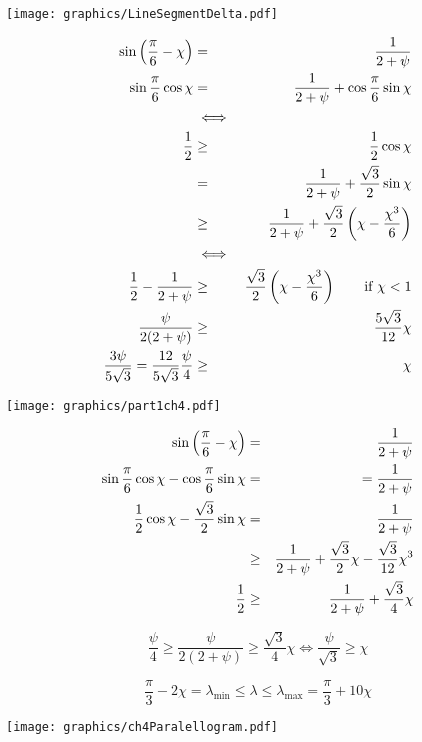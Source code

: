 


\begin{minipage}{\linewidth}
\begin{center}
\texttt{[image: graphics/LineSegmentDelta.pdf]}
\label{fig:LineSegmentDelta.pdf}
\end{center}
\end{minipage}
\begin{eqnarray*}
\sin \left( \frac{\pi}{6} - \chi \right) &=& \frac{1}{2+\psi}\\
\sin \frac{\pi}{6} \cos \chi &=& \frac{1}{2+\psi} + \cos \frac{\pi}{6} \sin \chi\\
&\iff&\\
\frac{1}{2} &\geq& \frac{1}{2} \cos \chi \\
&=& \frac{1}{2+\psi} + \frac{\sqrt{3}}{2} \sin \chi\\
&\geq& \frac{1}{2+\psi} + \frac{\sqrt{3}}{2} \left(  \chi - \frac{\chi^3}{6} \right)\\
&\iff&\\
\frac{1}{2}-\frac{1}{2+\psi} &\geq& \frac{\sqrt{3}}{2} \left(  \chi - \frac{\chi^3}{6} \right) \qquad \text{if }\chi < 1\\
\frac{\psi}{2 ( 2 + \psi)} &\geq&  \frac{5\sqrt{3}}{12} \chi\\
\frac{3 \psi}{5\sqrt{3}}=\frac{12}{5\sqrt{3}} \frac{\psi}{4} &\geq& \chi
\end{eqnarray*}

\begin{minipage}{\linewidth}
\begin{center}
\texttt{[image: graphics/part1ch4.pdf]}
\label{fig:part1ch4.pdf}
\end{center}
\end{minipage}
\begin{eqnarray*}
\sin \left( \frac{\pi}{6}- \chi \right) &=& \frac{1}{2+ \psi}\\
\sin \frac{\pi}{6} \cos \chi - \cos \frac{\pi}{6} \sin \chi &=& = \frac{1}{2+\psi}\\
\frac{1}{2} \cos \chi - \frac{\sqrt{3}}{2} \sin \chi &=& \frac{1}{2+\psi}\\
&\geq& \frac{1}{2+\psi} + \frac{\sqrt{3}}{2} \chi - \frac{\sqrt{3}}{12} \chi^3 \\
\frac{1}{2} &\geq&  \frac{1}{2+\psi} + \frac{\sqrt{3}}{4} \chi\\
\end{eqnarray*}

$$\frac{\psi}{4} \geq \frac{\psi}{2 (2 + \psi)}\geq \frac{\sqrt{3}}{4} \chi\iff \frac{\psi}{\sqrt{3}} \geq \chi$$

$$\frac{\pi}{3} - 2 \chi = \lambda_\text{min} \leq \lambda \leq \lambda_\text{max} = \frac{\pi}{3} + 10 \chi$$


\begin{minipage}{\linewidth}
\begin{center}
\texttt{[image: graphics/ch4Paralellogram.pdf]}
\label{fig:ch4Paralellogram.pdf}
\end{center}
\end{minipage}